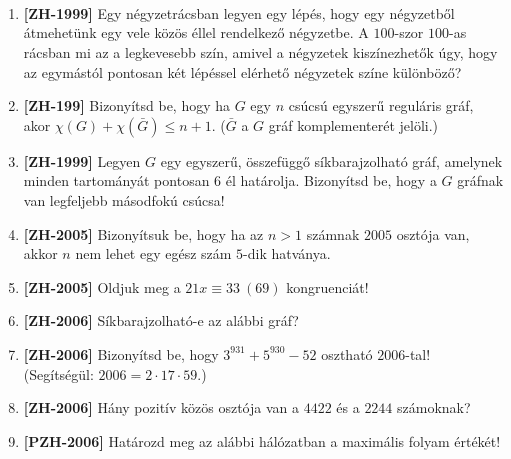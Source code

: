 \documentclass[a4paper]{article}
\begin{document}
	\noindent{} \\
	\noindent{}
	\\
	\\
	
\begin{enumerate}
	\item \textbf{[ZH-1999]} Egy négyzetrácsban legyen egy lépés, hogy egy négyzetből átmehetünk egy vele közös éllel rendelkező négyzetbe. A $100$-szor $100$-as rácsban mi az a legkevesebb szín, amivel a négyzetek kiszínezhetők úgy, hogy az egymástól pontosan két lépéssel elérhető négyzetek színe különböző?
	\item \textbf{[ZH-199]} Bizonyítsd be, hogy ha $G$ egy $n$ csúcsú egyszerű reguláris gráf, akor $\chi(G)+\chi(\bar{G})\leq n+1$. ($\bar{G}$ a $G$ gráf komplementerét jelöli.)
	\item \textbf{[ZH-1999]} Legyen $G$ egy egyszerű, összefüggő síkbarajzolható gráf, amelynek minden tartományát pontosan $6$ él határolja. Bizonyítsd be, hogy a $G$ gráfnak van legfeljebb másodfokú csúcsa!
	\item \textbf{[ZH-2005]} Bizonyítsuk be, hogy ha az $n>1$ számnak $2005$ osztója van, akkor $n$ nem lehet egy egész szám $5$-dik hatványa.
	\item \textbf{[ZH-2005]} Oldjuk meg a $21x\equiv 33\ (69)$ kongruenciát!
	\item \textbf{[ZH-2006]} Síkbarajzolható-e az alábbi gráf?
		\begin{figure}[h]
			\centering
			
		\end{figure}
	\item \textbf{[ZH-2006]} Bizonyítsd be, hogy $3^{931}+5^{930}-52$ osztható $2006$-tal! (Segítségül: $2006=2\cdot 17 \cdot 59$.)
	\item \textbf{[ZH-2006]} Hány pozitív közös osztója van a $4422$ és a $2244$ számoknak?
	\item \textbf{[PZH-2006]} Határozd meg az alábbi hálózatban a maximális folyam értékét!

\end{enumerate}
\end{document}

